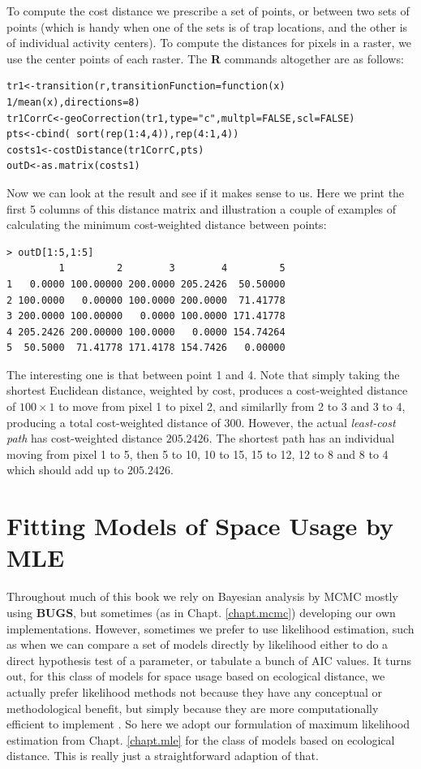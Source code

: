 To compute the cost distance we prescribe a set of points, or between
two sets of points (which is handy when one of the sets is of trap
locations, and the other is of individual activity centers).
To compute the distances for pixels in a raster, 
we use the center points of each raster.  The {\bf R}
 commands altogether are as follows:
{\small 
\begin{verbatim}
tr1<-transition(r,transitionFunction=function(x) 1/mean(x),directions=8)
tr1CorrC<-geoCorrection(tr1,type="c",multpl=FALSE,scl=FALSE)
pts<-cbind( sort(rep(1:4,4)),rep(4:1,4))
costs1<-costDistance(tr1CorrC,pts)
outD<-as.matrix(costs1)
\end{verbatim}
}
Now we can look at the result and see if it makes sense to us. Here we
print the first 5 columns of this distance matrix and illustration a
couple of examples of calculating the minimum cost-weighted distance
between points:
\begin{center}
{\small
\begin{verbatim}
> outD[1:5,1:5]
         1         2        3        4         5
1   0.0000 100.00000 200.0000 205.2426  50.50000
2 100.0000   0.00000 100.0000 200.0000  71.41778
3 200.0000 100.00000   0.0000 100.0000 171.41778
4 205.2426 200.00000 100.0000   0.0000 154.74264
5  50.5000  71.41778 171.4178 154.7426   0.00000
\end{verbatim}
} 
\end{center}
The interesting one is that between point 1 and 4. Note that simply
taking the shortest Euclidean distance, weighted by cost, produces a
cost-weighted distance of $100 \times 1$ to move from pixel 1 to pixel
2, and similarlly from 2 to 3 and 3 to 4, producing a total
cost-weighted distance of $300$. However, the actual {\it least-cost
  path} has cost-weighted distance $205.2426$. 
The shortest path has an individual moving from pixel 1 to 5, then 5
to 10, 10 to 15, 15 to 12, 12 to 8 and 8 to 4 which should add up to
$205.2426$.

\section{Fitting Models of Space Usage by MLE}
\label{ecoldist.sec.mle}

Throughout much of this book we rely on Bayesian analysis by MCMC mostly using 
{\bf BUGS}, but sometimes (as in Chapt. \ref{chapt.mcmc}) developing our own 
implementations. However, sometimes we prefer to use likelihood estimation, such as when
we can compare a set of models directly by likelihood either to do a
direct hypothesis test of a parameter, or tabulate a bunch of AIC values. It turns out, for this class
of models for space usage based on ecological distance, we actually prefer likelihood methods
not because they have any conceptual or methodological benefit, but simply because
they are more computationally efficient to implement \citep{royle_etal:2012ecol}.
So here we adopt our formulation of maximum likelihood estimation \citep{borchers_efford:2008} 
from Chapt. \ref{chapt.mle} 
for the class of models based on ecological distance. This is really just a straightforward
adaption of that.


